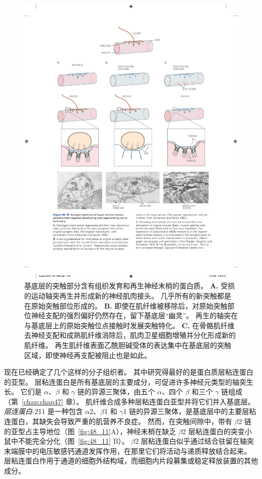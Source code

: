 \begin{figure}[htbp]
	\centering
	\includegraphics[width=1.0\linewidth]{chap48/fig_48_10}
	\caption{基底层的突触部分含有组织发育和再生神经末梢的蛋白质。
		\textbf{A.} 受损的运动轴突再生并形成新的神经肌肉接头。
		几乎所有的新突触都是在原始突触部位形成的\cite{glicksman1983differentiation}。
		\textbf{B.} 即使在肌纤维被移除后，对原始突触部位神经支配的强烈偏好仍然存在，留下基底层“幽灵”。 
		再生的轴突在与基底层上的原始突触位点接触时发展突触特化\cite{glicksman1983differentiation}。
		\textbf{C.} 在骨骼肌纤维去神经支配和成熟肌纤维消除后，肌肉卫星细胞增殖并分化形成新的肌纤维。
		再生肌纤维表面乙酰胆碱受体的表达集中在基底层的突触区域，即使神经再支配被阻止也是如此\cite{burden1979acetylcholine}。}
	\label{fig:48_10}
\end{figure}


现在已经确定了几个这样的分子组织者。
其中研究得最好的是蛋白质层粘连蛋白的亚型。
层粘连蛋白是所有基底层的主要成分，可促进许多神经元类型的轴突生长。
它们是 $ \alpha $、$ \beta $ 和 $ \gamma $ 链的异源三聚体，由五个 $ \alpha $、四个 $ \beta $ 和三个 $ \gamma $ 链组成（第~\ref{chap:chap47} 章）。
肌纤维合成多种层粘连蛋白亚型并将它们并入基底层。
\textit{层连蛋白}-211 是一种包含 $ \alpha $2、$ \beta $1 和 $ \gamma $1 链的异源三聚体，是基底层中的主要层粘连蛋白，其缺失会导致严重的肌营养不良症。
然而，在突触间隙中，带有 $ \beta $2 链的亚型占主导地位（图~\ref{fig:48_11}A），神经末梢在缺乏 $ \beta $2 层粘连蛋白的突变小鼠中不能完全分化（图~\ref{fig:48_11} B）。 
$ \beta $2 层粘连蛋白似乎通过结合驻留在轴突末端膜中的电压敏感钙通道发挥作用，在那里它们将活动与递质释放结合起来。
层粘连蛋白作用于通道的细胞外结构域，而细胞内片段募集或稳定释放装置的其他成分。


